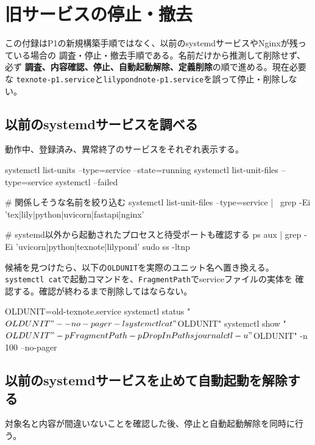 \documentclass[uplatex,a4paper,11pt]{jsarticle}
\begin{document}
\clearpage
\appendix
\section{旧サービスの停止・撤去}

この付録はP1の新規構築手順ではなく、以前のsystemdサービスやNginxが残っている場合の
調査・停止・撤去手順である。名前だけから推測して削除せず、必ず
\textbf{調査、内容確認、停止、自動起動解除、定義削除}の順で進める。現在必要な
\texttt{texnote-p1.service}と\texttt{lilypondnote-p1.service}を誤って停止・削除しない。

\subsection{以前のsystemdサービスを調べる}

動作中、登録済み、異常終了のサービスをそれぞれ表示する。

\begin{command}
systemctl list-units --type=service --state=running
systemctl list-unit-files --type=service
systemctl --failed

# 関係しそうな名前を絞り込む
systemctl list-unit-files --type=service | \
  grep -Ei 'tex|lily|python|uvicorn|fastapi|nginx'

# systemd以外から起動されたプロセスと待受ポートも確認する
ps aux | grep -Ei 'uvicorn|python|texnote|lilypond'
sudo ss -ltnp
\end{command}

候補を見つけたら、以下の\texttt{OLDUNIT}を実際のユニット名へ置き換える。
\texttt{systemctl cat}で起動コマンドを、\texttt{FragmentPath}でserviceファイルの実体を
確認する。確認が終わるまで削除してはならない。

\begin{command}
OLDUNIT=old-texnote.service
systemctl status "$OLDUNIT" --no-pager -l
systemctl cat "$OLDUNIT"
systemctl show "$OLDUNIT" -p FragmentPath -p DropInPaths
journalctl -u "$OLDUNIT" -n 100 --no-pager
\end{command}

\subsection{以前のsystemdサービスを止めて自動起動を解除する}

対象名と内容が間違いないことを確認した後、停止と自動起動解除を同時に行う。

\end{document}
